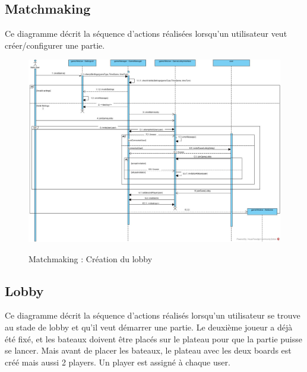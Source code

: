 \documentclass[../design_fonctionnement_sys.tex]{subfiles}
\begin{document}
\subsection{Matchmaking}
Ce diagramme décrit la séquence d'actions réalisées lorsqu'un utilisateur veut créer/configurer une partie.

\begin{figure}[H]
    \centering
    \includegraphics[scale=0.3]{img_design/PreLoby.jpg}
    \label{fig:seq_match_client}
    \caption{Matchmaking : Création du lobby}
\end{figure}

\newpage

\subsection{Lobby}
Ce diagramme décrit la séquence d'actions réalisés lorsqu'un utilisateur se trouve au stade de lobby et qu'il veut démarrer une partie.
Le deuxième joueur a déjà été fixé, et les bateaux doivent être placés sur le plateau pour que la partie puisse se lancer.
Mais avant de placer les bateaux, le plateau avec les deux boards est créé mais aussi 2 players. Un player est assigné à chaque user.
\end{document}
